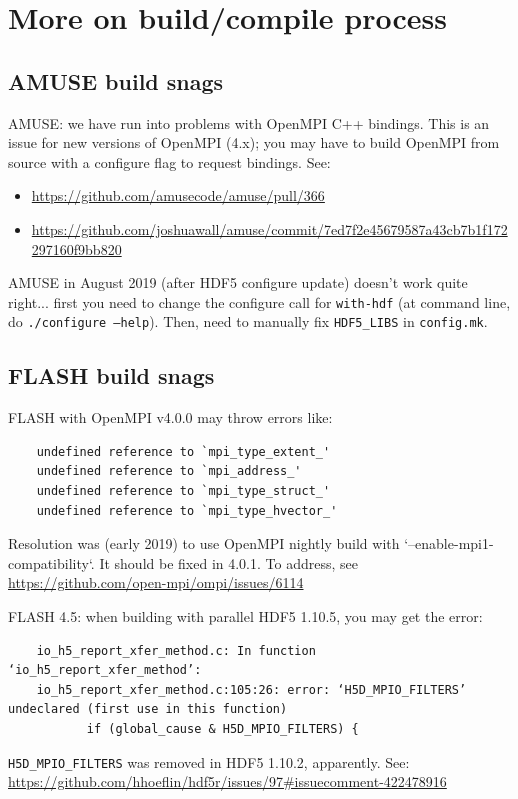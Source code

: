 \documentclass[10pt]{article}
\begin{document}
\section{More on build/compile process}

\subsection{AMUSE build snags}

AMUSE: we have run into problems with OpenMPI C++ bindings.
This is an issue for new versions of OpenMPI (4.x); you may have to build
OpenMPI from source with a configure flag to request bindings.  See:
\begin{itemize}
    \item \url{https://github.com/amusecode/amuse/pull/366}
    \item \url{https://github.com/joshuawall/amuse/commit/7ed7f2e45679587a43cb7b1f172297160f9bb820}
\end{itemize}

AMUSE in August 2019 (after HDF5 configure update) doesn't work quite right...
first you need to change the configure call for \texttt{with-hdf}
(at command line, do \texttt{./configure --help}).
Then, need to manually fix \texttt{HDF5\_LIBS} in \texttt{config.mk}.

\subsection{FLASH build snags}

FLASH with OpenMPI v4.0.0 may throw errors like:
\begin{verbatim}
    undefined reference to `mpi_type_extent_'
    undefined reference to `mpi_address_'
    undefined reference to `mpi_type_struct_'
    undefined reference to `mpi_type_hvector_'
\end{verbatim}
Resolution was (early 2019) to use OpenMPI nightly build with
`--enable-mpi1-compatibility`.  It should be fixed in 4.0.1.
To address, see \url{https://github.com/open-mpi/ompi/issues/6114}

FLASH 4.5: when building with parallel HDF5 1.10.5, you may get the error:
\begin{verbatim}
    io_h5_report_xfer_method.c: In function ‘io_h5_report_xfer_method’:
    io_h5_report_xfer_method.c:105:26: error: ‘H5D_MPIO_FILTERS’ undeclared (first use in this function)
           if (global_cause & H5D_MPIO_FILTERS) {
\end{verbatim}
\texttt{H5D\_MPIO\_FILTERS} was removed in HDF5 1.10.2, apparently. See:\\
\url{https://github.com/hhoeflin/hdf5r/issues/97#issuecomment-422478916}
\end{document}
